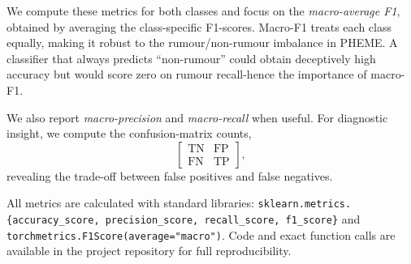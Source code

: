 \documentclass{cshonours}
\begin{document}
We compute these metrics for both classes and focus on the \emph{macro-average F1}, obtained by averaging the class-specific F1-scores.  
Macro-F1 treats each class equally, making it robust to the rumour/non-rumour imbalance in PHEME.  
A classifier that always predicts ``non-rumour'' could obtain deceptively high accuracy but would score zero on rumour recall-hence the importance of macro-F1.

We also report \emph{macro-precision} and \emph{macro-recall} when useful.  
For diagnostic insight, we compute the confusion-matrix counts,
\[
  \begin{bmatrix} \text{TN} & \text{FP} \\ \text{FN} & \text{TP} \end{bmatrix},
\]
revealing the trade-off between false positives and false negatives.

All metrics are calculated with standard libraries:  
\texttt{sklearn.metrics.\{accuracy\_score, precision\_score, recall\_score, f1\_score\}} and  
\texttt{torchmetrics.F1Score(average="macro")}.  
Code and exact function calls are available in the project repository for full reproducibility.
\end{document}
